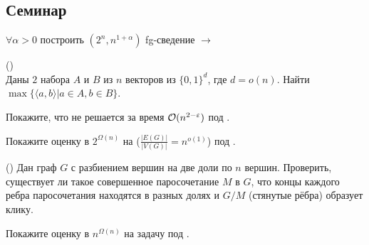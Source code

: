 \subsection{Семинар}

\begin{exerc}
    $\forall \alpha > 0$ построить $(2^n, n^{1 + \alpha})$ fg-сведение  $\to$ 
\end{exerc}

\begin{problem}()\\
    Даны $2$ набора $A$ и $B$ из $n$ векторов из $\{0, 1\}^d$, где $d = o(n)$. Найти $\max \{ \langle a, b \rangle | a \in A, b \in B \}$.
\end{problem}
    
\begin{exerc}
    Покажите, что  не решается за время $\mathcal{O}(n^{2 - \varepsilon})$ под .
\end{exerc}

\begin{exerc}
    Покажите оценку в $2^{\Omega(n)}$ на  ($\frac{|E(G)|}{|V(G)|} = n^{o(1)}$) под .
\end{exerc}

\begin{problem}()
    Дан граф $G$ с разбиением вершин на две доли по $n$ вершин. Проверить, существует ли такое совершенное паросочетание $M$ в $G$, что концы каждого ребра паросочетания находятся в разных долях и $G/M$ (стянутые рёбра) образует клику.
\end{problem}

\begin{exerc}\cite{Fomin2021}
    Покажите оценку в $n^{\Omega(n)}$ на задачу  под .
\end{exerc}



